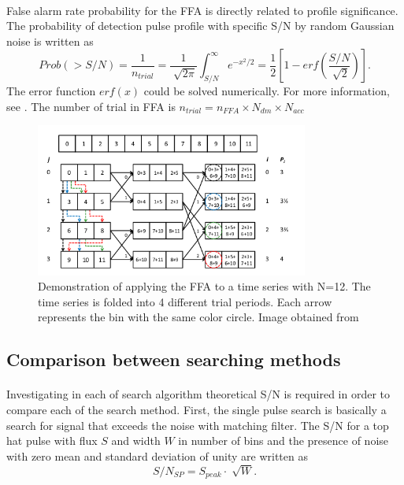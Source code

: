 \documentclass[thesis_msc.tex]{subfiles}
\begin{document}
         \paragraph{} False alarm rate probability for the FFA is directly related to profile significance. The probability of detection pulse profile with specific S/N by random Gaussian noise is written as 
                 \begin{equation}
        Prob(>S/N)=\frac{1}{n_{trial}}=\frac{1}{\sqrt[]{2\pi}} \int^{\infty}_{S/N} e^{-x^2/2}=\frac{1}{2} [1-erf(\frac{S/N}{\sqrt[]{2}})].
        \end{equation}
        The error function $erf(x)$ could be solved numerically. For more information, see \cite{press1992numerical}. The number of trial in FFA is $n_{trial}=n_{FFA} \times N_{dm} \times N_{acc} $
         \begin{figure}[h]
\centering
\includegraphics[width=0.80\textwidth]{figures/FFA.png}
\caption{Demonstration of applying the FFA to a time series with N=12. The time series is folded into 4 different trial periods. Each arrow represents the bin with the same color circle. Image obtained from  \cite{Andrew}}
\label{FFA_im}
\end{figure}
        \subsection{Comparison between searching methods} \label{Com}
        \paragraph{} Investigating in each of search algorithm theoretical S/N is required in order to compare each of the search method. First, the single pulse search is basically a search for signal that exceeds the noise with matching filter. The S/N for a top hat pulse with flux $S$ and width $W$ in number of bins and the presence of noise with zero mean and standard deviation of unity are written as   
		\begin{equation}
		S/N_{SP}=S_{peak} \cdot \sqrt[]{W} \label{snr_sp}.
		\end{equation}       
\end{document}
